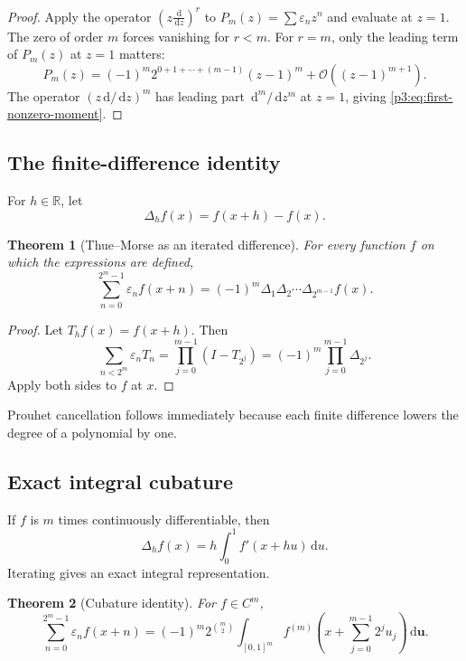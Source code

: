 \documentclass[11pt,oneside]{article}
\newtheorem{theorem}{Theorem}[section]
\theoremstyle{definition}
\theoremstyle{remark}
\newcommand{\R}{\mathbb R}
\newcommand{\dd}{\,\mathrm d}
\newcommand{\bigO}{\mathcal O}
\newcommand{\eps}{\varepsilon}
\begin{document}
\begin{proof}
Apply the operator $(z\frac{\dd}{\dd z})^r$ to
$P_m(z)=\sum\eps_nz^n$ and evaluate at $z=1$.  The zero of order $m$ forces
vanishing for $r<m$.  For $r=m$, only the leading term of
$P_m(z)$ at $z=1$ matters:
\[
 P_m(z)=(-1)^m2^{0+1+\cdots+(m-1)}(z-1)^m+\bigO((z-1)^{m+1}).
\]
The operator $(z\dd/\dd z)^m$ has leading part $\dd^m/\dd z^m$ at $z=1$,
giving \cref{p3:eq:first-nonzero-moment}.
\end{proof}

\subsection{The finite-difference identity}

For $h\in\R$, let
\begin{equation}\label{p3:eq:finite-difference-def}
 \Delta_hf(x)=f(x+h)-f(x).
\end{equation}

\begin{theorem}[Thue--Morse as an iterated difference]\label{p3:thm:finite-difference}
For every function $f$ on which the expressions are defined,
\begin{equation}\label{p3:eq:finite-difference}
 \boxed{\qquad
 \sum_{n=0}^{2^m-1}\eps_nf(x+n)
 =(-1)^m\Delta_1\Delta_2\cdots\Delta_{2^{m-1}}f(x).
 \qquad}
\end{equation}
\end{theorem}

\begin{proof}
Let $T_hf(x)=f(x+h)$.  Then
\[
 \sum_{n<2^m}\eps_nT_n
 =\prod_{j=0}^{m-1}(I-T_{2^j})
 =(-1)^m\prod_{j=0}^{m-1}\Delta_{2^j}.
\]
Apply both sides to $f$ at $x$.
\end{proof}

Prouhet cancellation follows immediately because each finite difference lowers
the degree of a polynomial by one.

\subsection{Exact integral cubature}

If $f$ is $m$ times continuously differentiable, then
\begin{equation}\label{p3:eq:one-difference-integral}
 \Delta_hf(x)=h\int_0^1f'(x+hu)\dd u.
\end{equation}
Iterating gives an exact integral representation.

\begin{theorem}[Cubature identity]\label{p3:thm:cubature}
For $f\in C^m$,
\begin{equation}\label{p3:eq:cubature}
 \boxed{\quad
 \sum_{n=0}^{2^m-1}\eps_nf(x+n)
 =(-1)^m2^{\binom m2}
  \int_{[0,1]^m}
  f^{(m)}\!\left(x+\sum_{j=0}^{m-1}2^ju_j\right)
  \dd\mathbf u.
 \quad}
\end{equation}
\end{theorem}
\end{document}
